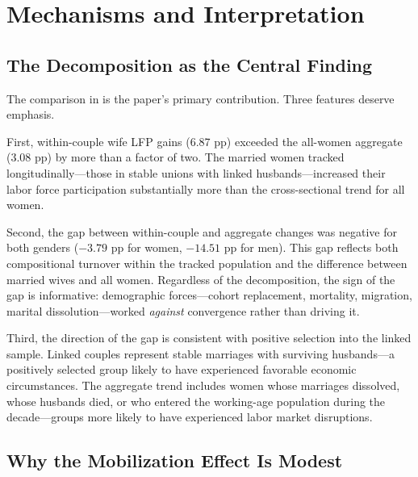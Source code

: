 \documentclass[12pt]{article}
\begin{document}




\section{Mechanisms and Interpretation}
\label{sec:mechanisms}

\subsection{The Decomposition as the Central Finding}

The comparison in  is the paper's primary contribution. Three features deserve emphasis.

First, within-couple wife LFP gains (6.87 pp) exceeded the all-women aggregate (3.08 pp) by more than a factor of two. The married women tracked longitudinally---those in stable unions with linked husbands---increased their labor force participation substantially more than the cross-sectional trend for all women.

Second, the gap between within-couple and aggregate changes was negative for both genders ($-3.79$ pp for women, $-14.51$ pp for men). This gap reflects both compositional turnover within the tracked population and the difference between married wives and all women. Regardless of the decomposition, the sign of the gap is informative: demographic forces---cohort replacement, mortality, migration, marital dissolution---worked \textit{against} convergence rather than driving it.

Third, the direction of the gap is consistent with positive selection into the linked sample. Linked couples represent stable marriages with surviving husbands---a positively selected group likely to have experienced favorable economic circumstances. The aggregate trend includes women whose marriages dissolved, whose husbands died, or who entered the working-age population during the decade---groups more likely to have experienced labor market disruptions.

\subsection{Why the Mobilization Effect Is Modest}
\end{document}
